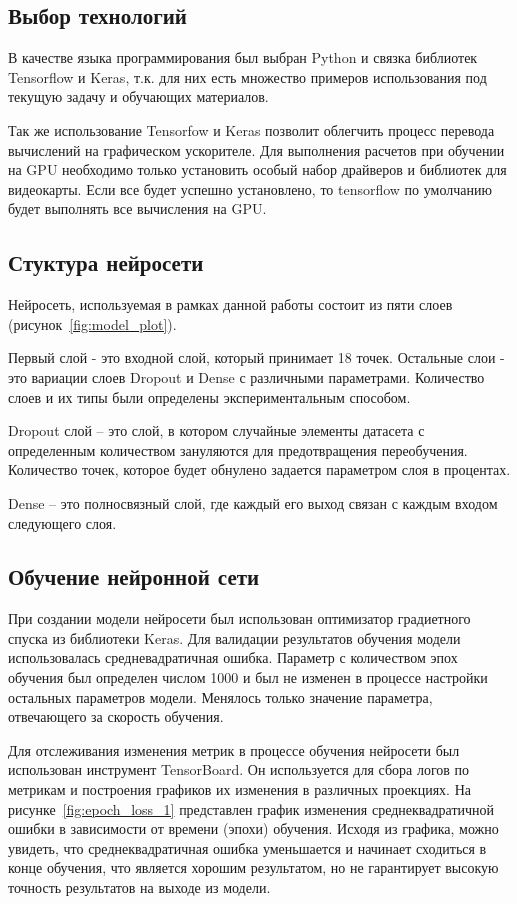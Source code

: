 \subsection{Выбор технологий}

В качестве языка программирования был выбран Python и связка библиотек Tensorflow и Keras, т.к. для них есть множество примеров использования под текущую задачу и обучающих материалов.


Так же использование Tensorfow и Keras позволит облегчить процесс перевода вычислений на графическом ускорителе. Для выполнения расчетов при обучении на GPU необходимо только установить особый набор драйверов и библиотек для видеокарты. Если все будет успешно установлено, то tensorflow по умолчанию будет выполнять все вычисления на GPU.

\subsection{Стуктура нейросети}
Нейросеть, используемая в рамках данной работы состоит из пяти слоев (рисунок~\ref{fig:model_plot}).




Первый слой - это входной слой, который принимает 18 точек. Остальные слои - это вариации слоев Dropout и Dense с различными параметрами. Количество слоев и их типы были определены экспериментальным способом.


Dropout слой -- это слой, в котором случайные элементы датасета с определенным количеством зануляются для предотвращения переобучения. Количество точек, которое будет обнулено задается параметром слоя в процентах.


Dense -- это полносвязный слой, где каждый его выход связан с каждым входом следующего слоя.

\subsection{Обучение нейронной сети}
При создании модели нейросети был использован оптимизатор градиетного спуска из библиотеки Keras. Для валидации результатов обучения модели использовалась средневадратичная ошибка. Параметр с количеством эпох обучения был определен числом 1000 и был не изменен в процессе настройки остальных параметров модели. Менялось только значение параметра, отвечающего за скорость обучения.


Для отслеживания изменения метрик в процессе обучения нейросети был использован инструмент TensorBoard. Он используется для сбора логов по метрикам и построения графиков их изменения в различных проекциях. На рисунке~\ref{fig:epoch_loss_1} представлен график изменения среднеквадратичной ошибки в зависимости от времени (эпохи) обучения. Исходя из графика, можно увидеть, что среднеквадратичная ошибка уменьшается и начинает сходиться в конце обучения, что является хорошим результатом, но не гарантирует высокую точность результатов на выходе из модели.


